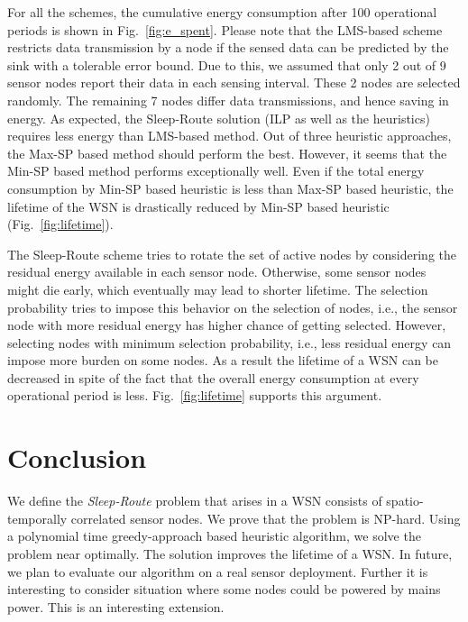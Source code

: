 \documentclass[conference]{IEEEtran}
\begin{document}
For all the schemes, the cumulative energy consumption after 100 operational periods is shown in Fig.~\ref{fig:e_spent}. Please note that the LMS-based scheme restricts data transmission by a node if the sensed data can be predicted by the sink with a tolerable error bound. Due to this, we assumed that only 2 out of 9 sensor nodes report their data in each sensing interval.  These 2 nodes are selected randomly. The remaining 7 nodes differ data transmissions, and hence saving in energy. As expected, the Sleep-Route solution (ILP as well as the heuristics) requires less energy than LMS-based method. Out of three heuristic approaches, the Max-SP based method should perform the best. However, it seems that the Min-SP based method performs exceptionally well. Even if the total energy consumption by Min-SP based heuristic is less than Max-SP based heuristic, the lifetime of the WSN is drastically reduced by Min-SP based heuristic (Fig.~\ref{fig:lifetime}).

The Sleep-Route scheme tries to rotate the set of active nodes by considering the residual energy available in each sensor node. Otherwise, some sensor nodes might die early, which eventually may lead to shorter lifetime. The selection probability tries to impose this behavior on the selection of nodes, i.e., the sensor node with more residual energy has higher chance of getting selected. However, selecting nodes with minimum selection probability, i.e., less residual energy can impose more burden on some nodes. As a result the lifetime of a WSN can be decreased in spite of the fact that the overall energy consumption at every operational period is less. Fig.~\ref{fig:lifetime} supports this argument.
\section{Conclusion}
We define the \emph{Sleep-Route} problem that arises in a WSN consists of spatio-temporally correlated sensor nodes. We prove that the problem is NP-hard. Using a polynomial time greedy-approach based heuristic algorithm, we solve the problem near optimally. The solution improves the lifetime of a WSN. In future, we plan to evaluate our algorithm on a real sensor deployment. Further it is interesting to consider situation where some nodes could be powered by mains power\cite{vazifehdan2012analytical}. This is an interesting extension.











\end{document}

